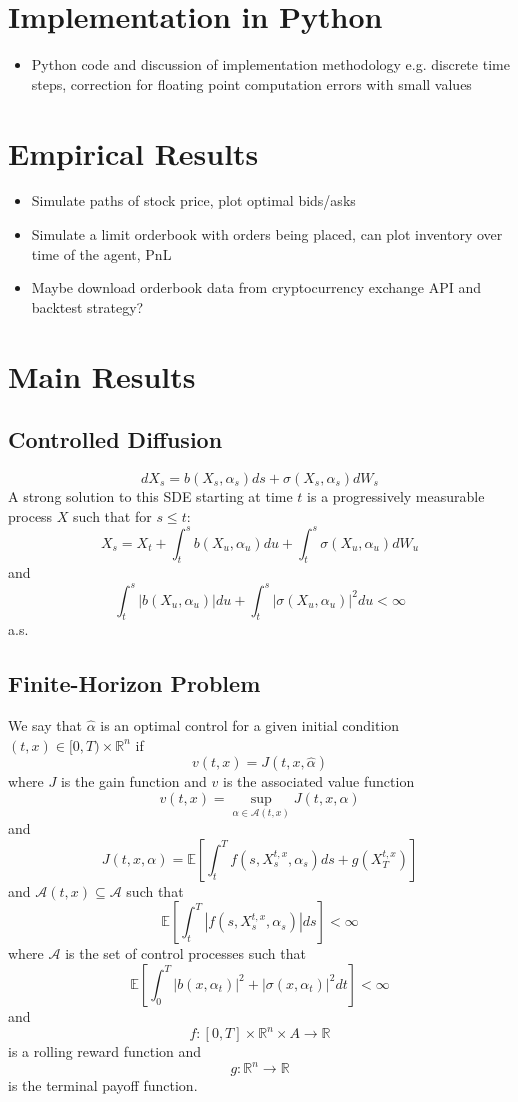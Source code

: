 \documentclass{article}
\begin{document}
\section{Implementation in Python}
\begin{itemize}
    \item Python code and discussion of implementation methodology e.g. discrete time steps, correction for floating point computation errors with small values
\end{itemize}
\section{Empirical Results}
\begin{itemize}
    \item Simulate paths of stock price, plot optimal bids/asks 
    \item Simulate a limit orderbook with orders being placed, can plot inventory over time of the agent, PnL
    \item Maybe download orderbook data from cryptocurrency exchange API and backtest strategy?
\end{itemize}
\break
\section{Main Results}
\subsection{Controlled Diffusion}
$$dX_s=b(X_s,\alpha_s)ds+\sigma(X_s,\alpha_s)dW_s$$
A strong solution to this SDE starting at time $t$ is a progressively measurable process $X$ such that for $s\leq t$:
$$X_s=X_t+\int_{t}^{s}b(X_u,\alpha_u)du+\int_t^s\sigma(X_u,\alpha_u)dW_u$$
and
$$\int_t^s|b(X_u,\alpha_u)|du+\int_t^s|\sigma(X_u,\alpha_u)|^2du<\infty$$
a.s.
\subsection{Finite-Horizon Problem}
We say that $\hat{\alpha}$ is an optimal control for a given initial condition $(t,x)\in[0,T)\times\mathbb{R}^n$ if
$$v(t,x)=J(t,x,\hat{\alpha})$$
where $J$ is the gain function and $v$ is the associated value function
$$v(t,x)=\sup\limits_{\alpha\in\mathcal{A}(t,x)}J(t,x,\alpha)$$
and
$$J(t,x,\alpha)=\mathbb{E}\left[\int_t^Tf(s,X_s^{t,x},\alpha_s)ds+g(X_T^{t,x})\right]$$
and $\mathcal{A}(t,x)\subseteq\mathcal{A}$ such that
$$\mathbb{E}\left[\int_t^T|f(s,X_s^{t,x},\alpha_s)|ds\right]<\infty$$
where $\mathcal{A}$ is the set of control processes such that
$$\mathbb{E}\left[\int_0^T|b(x,\alpha_t)|^2+|\sigma(x,\alpha_t)|^2dt\right]<\infty$$
and
$$f:[0,T]\times\mathbb{R}^n\times A\rightarrow\mathbb{R}$$
is a rolling reward function and 
$$g:\mathbb{R}^n\rightarrow\mathbb{R}$$
is the terminal payoff function.
\end{document}
